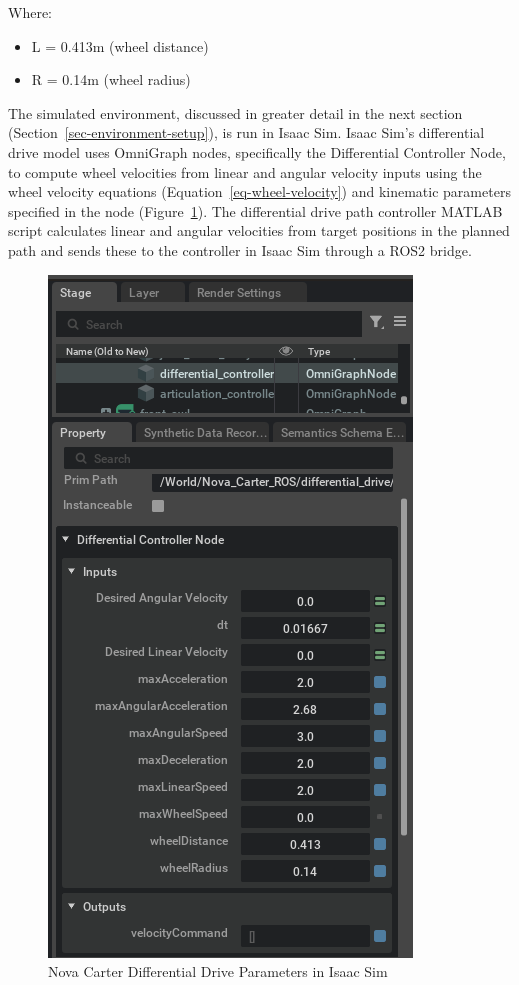 \documentclass[
  letterpaper,
  DIV=11,
  numbers=noendperiod]{scrartcl}
\providecommand{\tightlist}{%
  \setlength{\itemsep}{0pt}\setlength{\parskip}{0pt}}\usepackage{longtable,booktabs,array}
\begin{document}
Where:

\begin{itemize}
\tightlist
\item
  L = 0.413m (wheel distance)
\item
  R = 0.14m (wheel radius)
\end{itemize}

The simulated environment, discussed in greater detail in the next
section (Section~\ref{sec-environment-setup}), is run in Isaac Sim.
Isaac Sim's differential drive model uses OmniGraph nodes, specifically
the Differential Controller Node, to compute wheel velocities from
linear and angular velocity inputs using the wheel velocity equations
(Equation~\ref{eq-wheel-velocity}) and kinematic parameters specified in
the node (Figure~\ref{fig-differential-controller}). The differential
drive path controller MATLAB script calculates linear and angular
velocities from target positions in the planned path and sends these to
the controller in Isaac Sim through a ROS2 bridge.

\begin{figure}

{\centering \includegraphics{differential-controller.png}

}

\caption{\label{fig-differential-controller}Nova Carter Differential
Drive Parameters in Isaac Sim}

\end{figure}
\end{document}

